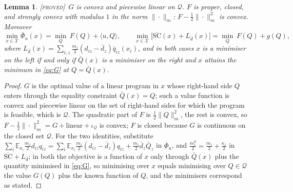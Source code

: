 \documentclass[11pt]{article}
\newtheorem{lemma}[theorem]{Lemma}
\theoremstyle{definition}
\theoremstyle{remark}
\newcommand{\cQ}{\mathcal{Q}}
\newcommand{\cX}{\mathcal{X}}
\newcommand{\ip}[2]{\langle #1,#2\rangle}
\newcommand{\Qbar}{\bar Q}
\newcommand{\qbar}{\bar q}
\newcommand{\dbar}{\bar d}
\newcommand{\SCbar}{\overline{\mathrm{SC}}}
\newcommand{\Phibar}{\overline{\Phi}}
\newcommand{\norm}[2]{\|#1\|_{#2}}
\newcommand{\PROVED}{{\normalfont\textsc{[proved]}}}
\begin{document}
\begin{lemma}\label{lem:F}\PROVED\
$G$ is convex and piecewise linear on $\cQ$. $F$ is proper, closed, and strongly convex with modulus $1$ in the norm $\norm{\cdot}{m}$: $F-\tfrac12\norm{\cdot}{m}^2$ is convex. Moreover
\[\min_{x\in\cX}\Phibar_u(x)=\min_{Q}\ F(Q)+\ip{u}{Q},\qquad \min_{x\in\cX}\big[\SCbar(x)+L_{\dbar}(x)\big]=\min_Q\ F(Q)+g(Q),\]
where $L_{\dbar}(x)=\sum_{i,z}\tfrac{m_z}{2}(d_{iz}-\dbar_z)\qbar_{iz}(x_i)$, and in both cases $x$ is a minimiser on the left if and only if $\Qbar(x)$ is a minimiser on the right and $x$ attains the minimum in \eqref{eq:G} at $Q=\Qbar(x)$.
\end{lemma}
\begin{proof}
$G$ is the optimal value of a linear program in $x$ whose right-hand side $Q$ enters through the equality constraint $\Qbar(x)=Q$; such a value function is convex and piecewise linear on the set of right-hand sides for which the program is feasible, which is $\cQ$. The quadratic part of $F$ is $\tfrac12\norm{Q}{m}^2$, the rest is convex, so $F-\tfrac12\norm{\cdot}{m}^2=G+\text{linear}+\iota_\cQ$ is convex; $F$ is closed because $G$ is continuous on the closed set $\cQ$. For the two identities, substitute $\sum_i\mathbb E_{x_i}\tfrac{m_z}{2}d_{iz}q_{iz}=\sum_i\mathbb E_{x_i}\tfrac{m_z}{2}(d_{iz}-\dbar_z)q_{iz}+\tfrac{m_z}{2}\dbar_z\Qbar_z$ in $\Phibar_u$, and $\tfrac{m^S_z}{2}=\tfrac{m_z}{2}+\tfrac{\kappa_z}{2}$ in $\SCbar+L_{\dbar}$; in both the objective is a function of $x$ only through $\Qbar(x)$ plus the quantity minimised in \eqref{eq:G}, so minimising over $x$ equals minimising over $Q\in\cQ$ the value $G(Q)$ plus the known function of $Q$, and the minimisers correspond as stated.
\end{proof}
\end{document}
